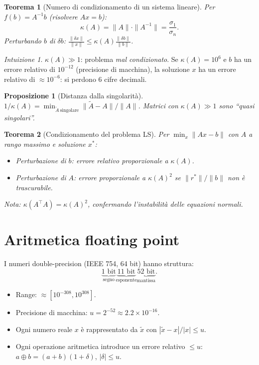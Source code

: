 \documentclass[11pt, a4paper, twoside]{book}
\theoremstyle{definition}
\theoremstyle{plain}
\newtheorem{thm}{Teorema}[chapter]
\newtheorem{prop}{Proposizione}[chapter]
\theoremstyle{remark}
\newtheorem{intuition}{Intuizione}[chapter]
\begin{document}
\begin{thm}[Numero di condizionamento di un sistema lineare]
Per $f(b) = A^{-1}b$ (risolvere $Ax = b$):
\[
  \boxed{\kappa(A) = \|A\| \cdot \|A^{-1}\| = \frac{\sigma_1}{\sigma_n}}.
\]
Perturbando $b$ di $\delta b$: $\frac{\|\delta x\|}{\|x\|} \leq \kappa(A) \frac{\|\delta b\|}{\|b\|}$.
\end{thm}

\begin{intuition}
$\kappa(A) \gg 1$: problema \emph{mal condizionato}. Se $\kappa(A) = 10^6$ e $b$ ha un errore relativo di $10^{-12}$ (precisione di macchina), la soluzione $x$ ha un errore relativo di $\approx 10^{-6}$: si perdono 6 cifre decimali.
\end{intuition}

\begin{prop}[Distanza dalla singolarità]
$1/\kappa(A) = \min_{\tilde{A}\ \text{singolare}} \|\tilde{A} - A\|/\|A\|$.
Matrici con $\kappa(A) \gg 1$ sono ``quasi singolari''.
\end{prop}

\begin{thm}[Condizionamento del problema LS]
Per $\min_x \|Ax - b\|$ con $A$ a rango massimo e soluzione $x^*$:
\begin{itemize}
  \item Perturbazione di $b$: errore relativo proporzionale a $\kappa(A)$.
  \item Perturbazione di $A$: errore proporzionale a $\kappa(A)^2$ se $\|r^*\|/\|b\|$ non è trascurabile.
\end{itemize}
Nota: $\kappa(A^\top A) = \kappa(A)^2$, confermando l'instabilità delle equazioni normali.
\end{thm}

\section{Aritmetica floating point}

I numeri double-precision (IEEE 754, 64 bit) hanno struttura:
\[
  \underbrace{1 \text{ bit}}_{\text{segno}} \underbrace{11 \text{ bit}}_{\text{esponente}} \underbrace{52 \text{ bit}}_{\text{mantissa}}.
\]
\begin{itemize}
  \item Range: $\approx [10^{-308}, 10^{308}]$.
  \item Precisione di macchina: $u = 2^{-52} \approx 2.2 \times 10^{-16}$.
  \item Ogni numero reale $x$ è rappresentato da $\tilde{x}$ con $|\tilde{x} - x|/|x| \leq u$.
  \item Ogni operazione aritmetica introduce un errore relativo $\leq u$: $a \oplus b = (a+b)(1+\delta)$, $|\delta| \leq u$.
\end{itemize}
\end{document}
